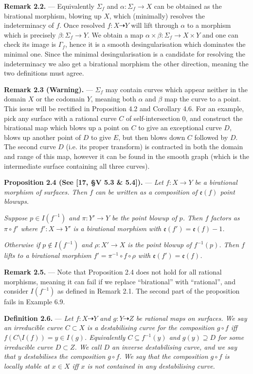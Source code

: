 \documentclass[11pt]{article}
\newcommand{\rat}{\dashrightarrow}
\newcommand{\exc}{\mathfrak{e}}
\newcommand{\sourceheading}[1]{\par\medskip\noindent\textbf{#1.} --- }
\newcommand{\sourcestatement}[2]{\par\medskip\noindent\textbf{#1.} --- \textit{#2}\par}
\begin{document}
\sourceheading{Remark 2.2}
Equivalently $\Sigma_f$ and $\alpha:\Sigma_f\to X$ can be obtained as the
birational morphism, blowing up $X$, which (minimally) resolves the
indeterminacy of $f$. Once resolved $f:X\rat Y$ will lift through
$\alpha$ to a morphism which is precisely $\beta:\Sigma_f\to Y$.
We obtain a map $\alpha\times\beta:\Sigma_f\to X\times Y$ and one can
check its image is $\Gamma_f$, hence it is a smooth desingularisation which
dominates the minimal one. Since the minimal desingularisation is a
candidate for resolving the indeterminacy we also get a birational morphism
the other direction, meaning the two definitions must agree.

\sourceheading{Remark 2.3 (Warning)}
$\Sigma_f$ may contain curves which appear neither in the domain $X$ or
the codomain $Y$, meaning both $\alpha$ and $\beta$ map the curve to a
point. This issue will be rectified in Proposition 4.2 and Corollary 4.6.
For an example, pick any surface with a rational curve $C$ of
self-intersection 0, and construct the birational map which blows up a
point on $C$ to give an exceptional curve $D$, blows up another point of
$D$ to give $E$, but then blows down $C$ followed by $D$. The second curve
$D$ (i.e. its proper transform) is contracted in both the domain and range
of this map, however it can be found in the smooth graph (which is the
intermediate surface containing all three curves).

\sourcestatement{Proposition 2.4 (See [17, \S V 5.3 \& 5.4])}{Let
$f:X\to Y$ be a birational morphism of surfaces. Then $f$ can be written
as a composition of $\exc(f)$ point blowups.}
\textit{Suppose $p\in I(f^{-1})$ and $\pi:Y'\to Y$ be the point blowup of
$p$. Then $f$ factors as $\pi\circ f'$ where $f':X\to Y'$ is a birational
morphism with $\exc(f')=\exc(f)-1$.}

\textit{Otherwise if $p\notin I(f^{-1})$ and $\rho:X'\to X$ is the point
blowup of $f^{-1}(p)$. Then $f$ lifts to a birational morphism
$f'=\pi^{-1}\circ f\circ\rho$ with $\exc(f')=\exc(f)$.}

\sourceheading{Remark 2.5}
Note that Proposition 2.4 does not hold for all rational morphisms, meaning
it can fail if we replace ``birational'' with ``rational'', and consider
$I(f^{-1})$ as defined in Remark 2.1. The second part of the proposition
fails in Example 6.9.

\sourcestatement{Definition 2.6}{Let $f:X\rat Y$ and $g:Y\rat Z$ be
rational maps on surfaces. We say an irreducible curve $C\subset X$ is a
destabilising curve for the composition $g\circ f$ iff
$f(C\setminus I(f))=y\in I(g)$. Equivalently $C\subseteq f^{-1}(y)$ and
$g(y)\supseteq D$ for some irreducible curve $D\subset Z$. We call $D$ an
inverse destabilising curve, and we say that $y$ destabilises the composition
$g\circ f$. We say that the composition $g\circ f$ is locally stable at
$x\in X$ iff $x$ is not contained in any destabilising curve.}
\end{document}
